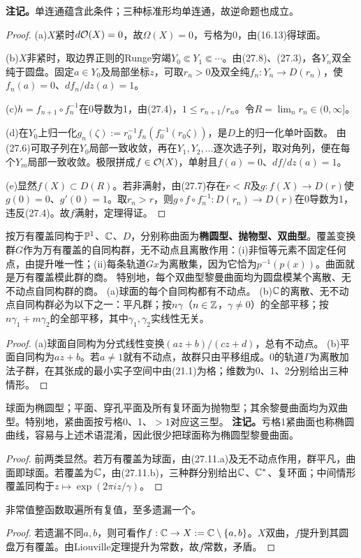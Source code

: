 \textbf{注记。}单连通蕴含此条件；三种标准形均单连通，故逆命题也成立。
\begin{proof}
(a)$X$紧时$d\mathcal O(X)=0$，故$\Omega(X)=0$，亏格为0，由(16.13)得球面。

(b)$X$非紧时，取边界正则的Runge穷竭$Y_0\Subset Y_1\Subset\cdots$。由(27.8)、(27.3)，各$Y_n$双全纯于圆盘。固定$a\in Y_0$及局部坐标$z$，可取$r_n>0$及双全纯$f_n:Y_n\to D(r_n)$，使$f_n(a)=0$、$df_n/dz(a)=1$。

(c)$h=f_{n+1}\circ f_n^{-1}$在0导数为1，由(27.4)，$1\le r_{n+1}/r_n$。令$R=\lim_nr_n\in(0,\infty]$。

(d)在$Y_0$上归一化$g_n(\zeta):=r_0^{-1}f_n(f_0^{-1}(r_0\zeta))$，是$D$上的归一化单叶函数。
由(27.6)可取子列在$Y_0$局部一致收敛，再在$Y_1,Y_2,\ldots$逐次选子列，取对角列，便在每个$Y_m$局部一致收敛。极限拼成$f\in\mathcal O(X)$，单射且$f(a)=0$、$df/dz(a)=1$。

(e)显然$f(X)\subset D(R)$。若非满射，由(27.7)存在$r<R$及$g:f(X)\to D(r)$使$g(0)=0$、$g'(0)=1$。取$r_n>r$，则$g\circ f\circ f_n^{-1}:D(r_n)\to D(r)$在0导数为1，违反(27.4)。故$f$满射，定理得证。
\end{proof}
按万有覆盖同构于$\mathbb P^1$、$\mathbb C$、$D$，分别称曲面为\textbf{椭圆型、抛物型、双曲型}。覆盖变换群$G$作为万有覆盖的自同构群，无不动点且离散作用：(i)非恒等元素不固定任何点，由提升唯一性；(ii)每条轨道$Gx$为离散集，因为它恰为$p^{-1}(p(x))$。曲面就是万有覆盖模此群的商。
特别地，每个双曲型黎曼曲面均为圆盘模某个离散、无不动点自同构群的商。
(a)球面的每个自同构都有不动点。
(b)$\mathbb C$的离散、无不动点自同构群必为以下之一：平凡群；按$n\gamma$（$n\in\mathbb Z$，$\gamma\ne0$）的全部平移；按$n\gamma_1+m\gamma_2$的全部平移，其中$\gamma_1,\gamma_2$实线性无关。
\begin{proof}
(a)球面自同构为分式线性变换$(az+b)/(cz+d)$，总有不动点。
(b)平面自同构为$az+b$。若$a\ne1$就有不动点，故群只由平移组成。0的轨道$\Gamma$为离散加法子群，在其张成的最小实子空间中由(21.1)为格；维数为0、1、2分别给出三种情形。
\end{proof}
球面为椭圆型；平面、穿孔平面及所有复环面为抛物型；其余黎曼曲面均为双曲型。特别地，紧曲面按亏格0、1、$>1$对应这三型。
\textbf{注记。}亏格1紧曲面也称椭圆曲线，容易与上述术语混淆，因此很少把球面称为椭圆型黎曼曲面。
\begin{proof}
前两类显然。若万有覆盖为球面，由(27.11.a)及无不动点作用，群平凡，曲面即球面。若覆盖为$\mathbb C$，由(27.11.b)，三种群分别给出$\mathbb C$、$\mathbb C^*$、复环面；中间情形覆盖同构于$z\mapsto\exp(2\pi iz/\gamma)$。
\end{proof}
非常值整函数取遍所有复值，至多遗漏一个。
\begin{proof}
若遗漏不同$a,b$，则可看作$f:\mathbb C\to X:=\mathbb C\setminus\{a,b\}$。$X$双曲，$f$提升到其圆盘万有覆盖。由Liouville定理提升为常数，故$f$常数，矛盾。
\end{proof}
